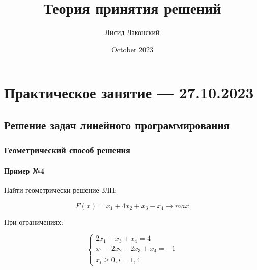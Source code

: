\documentclass{article}
\title{Теория принятия решений}
\author{Лисид Лаконский}
\date{October 2023}
\begin{document}
\raggedright

\maketitle

\tableofcontents
\pagebreak

\section{Практическое занятие — 27.10.2023}

\subsection{Решение задач линейного программирования}

\subsubsection{Геометрический способ решения}

\paragraph{Пример №4}

Найти геометрически решение ЗЛП:

$$
F(\overline{x}) = x_1 + 4x_2 + x_3 - x_4 \to max
$$

При ограничениях:

$$
\begin{cases}
    2x_1 - x_3 + x_4 = 4 \\
    x_1 - 2x_2 - 2x_3 + x_4 = -1 \\
    x_i \ge 0, i = \overline{1, 4}
\end{cases}
$$
\end{document}
